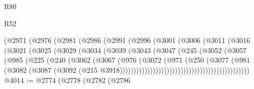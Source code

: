 \begin{lexlean}{R80}
\begin{lexlean}{R52}
\begin{coremodule}
{{{{{{{{{{{{{{{{{{{{{{{{{{{{{{{{{{{{{{{{{{{{{{{{{{{{{{{{{{{{{{{{{{{{{{{{{{{{{{{{{{{{{{{{{{{{{{{{{{{{{{{{{{{{{{{{{{{{{{{{{{{{{{{{{{{{{{{{{{{{{{{{{{{{{{{{{{{{{{{{{{{{{{{{{{{{{{{{{{{{{{{{{{{{{{{{{{{{{{                            (@2971
                              (@2976
                                (@2981
                                  (@2986
                                    (@2991
                                      (@2996
                                        (@3001
                                          (@3006
                                            (@3011
                                              (@3016
                                                (@3021
                                                  (@3025
                                                    (@3029
                                                      (@3034
                                                        (@3039
                                                          (@3043
                                                            (@3047
                                                              (@245
                                                                (@3052
                                                                  (@3057
                                                                    (@985
                                                                      (@225
                                                                        (@240
                                                                          (@3062
                                                                            (@3067
                                                                              (@976
                                                                                (@3072
                                                                                  (@971
                                                                                    (@250
                                                                                      (@3077
                                                                                        (@981
                                                                                          (@3082
                                                                                            (@3087
                                                                                              (@3092
                                                                                                (@215
                                                                                                  @3918)))))))))))))))))))))))))))))))))))))))))))))))
@4014 := @2774
    (@2778
      (@2782
        (@2786
}}}}}}}}}}}}}}}}}}}}}}}}}}}}}}}}}}}}}}}}}}}}}}}}}}}}}}}}}}}}}}}}}}}}}}}}}}}}}}}}}}}}}}}}}}}}}}}}}}}}}}}}}}}}}}}}}}}}}}}}}}}}}}}}}}}}}}}}}}}}}}}}}}}}}}}}}}}}}}}}}}}}}}}}}}}}}}}}}}}}}}}}}}}}}}}}}}}}}}
\end{coremodule}
\end{lexlean}
\end{lexlean}

